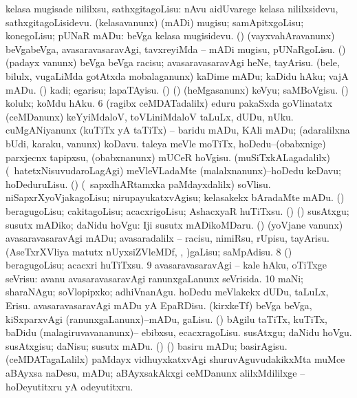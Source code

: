  kelasa mugisade nililxsu, sathxgitagoLisu:  nAvu aidUvarege kelasa nililxsidevu, sathxgitagoLisidevu. 
 (kelasavanunx) (mADi) mugisu; samApitxgoLisu; konegoLisu; pUNaR mADu:  beVga kelasa mugisidevu. 
 (\AmA) (vayxvahAravanunx) beVgabeVga, avasaravasaravAgi, tavxreyiMda -- mADi mugisu, pUNaRgoLisu. 
 (\AmA) (padayx \mo vanunx) beVga beVga racisu; avasaravasaravAgi heNe, tayArisu. 
 (bele, bilulx, \mo vugaLiMda gotAtxda mobalaganunx) kaDime mADu; kaDidu hAku; vajA mADu. 
 (\ashi) kadi; egarisu; lapaTAyisu. 
 (\birx) (\ashi) (heMgasanunx) keVyu; saMBoVgisu. 
 (\ashi) kolulx; koMdu hAku. 
\eanum
\numie
\num{6}  (ragibx ceMDATadalilx) eduru pakaSxda goVlinatatx (ceMDanunx) keYyiMdaloV, toVLiniMdaloV taLuLx, dUDu, nUku. 
  
\banum
{} cuMgANiyanunx (kuTiTx yA taTiTx) -- baridu mADu, KAli mADu; (adaralilxna bUdi, karaku, \mo vanunx) koDavu. 
 taleya meVle moTiTx, hoDedu--(obabxnige) parxjecnx tapipxsu, (obabxnanunx) mUCeR hoVgisu. 
 (muSiTxkALagadalilx) (\sA\ hatetxNisuvudaroLagAgi) meVleVLadaMte (malalxnanunx)--hoDedu keDavu; hoDeduruLisu. 
 (\rUpa) (\kanmu\ sapxdhARtamxka paMdayxdalilx) soVlisu. 
 niSapxrXyoVjakagoLisu; nirupayukatxvAgisu; kelasakekx bAradaMte mADu. 
 (\ashi) beragugoLisu; cakitagoLisu; acacxrigoLisu; AshacxyaR huTiTxsu. 
 (\ashi) (\AtAmx) susAtxgu; susutx mADiko; daNidu hoVgu:  Iji susutx mADikoMDaru. 
 (\AmA) (yoVjane \mo vanunx) avasaravasaravAgi mADu; avasaradalilx -- racisu, nimiRsu, rUpisu, tayArisu. 
 (AseTxrXVliya matutx nUyxsiZVleMDf, \ame, \ashi)gaLisu; saMpAdisu. 
\eanum
\numie
\num{8}  (\AmA) beragugoLisu; acacxri huTiTxsu. 
\num{9}  avasaravasaravAgi -- kale hAku, oTiTxge seVrisu:  avanu avasaravasaravAgi  ranunxgaLanunx seVrisida. 
\num{10}  maNi; sharaNAgu; soVlopipxko; adhiVnanAgu. 
  
\banum
{} hoDedu meVlakekx dUDu, taLuLx, Erisu. 
 avasaravasaravAgi mADu yA EpaRDisu. 
 (kirxkeTf) beVga beVga, kiSxparxvAgi (ranunxgaLanunx)--mADu, gaLisu. 
 (\birx) bAgilu taTiTx, kuTiTx, baDidu (malagiruvavananunx)-- ebibxsu, ecacxragoLisu. 
 susAtxgu; daNidu hoVgu. 
 susAtxgisu; daNisu; susutx mADu. 
 (\ame) (\ashi) basiru mADu; basirAgisu. 
 (ceMDATagaLalilx) paMdayx vidhuyxkatxvAgi shuruvAguvudakikxMta muMce aBAyxsa naDesu, mADu; aBAyxsakAkxgi ceMDanunx alilxMdililxge -- hoDeyutitxru yA odeyutitxru. 
\eanum
\numie
\enum
\emng

